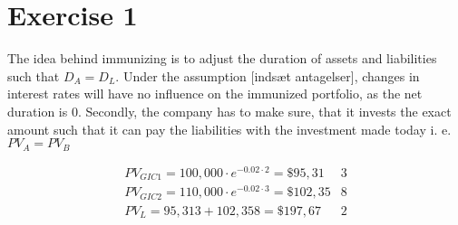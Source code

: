 
\section*{Exercise 1}

The idea behind immunizing is to adjust the duration of assets and liabilities such that $D_{A}=D_{L}$. Under the assumption [indsæt antagelser], changes in interest rates will have no influence on the immunized portfolio, as the net duration is 0. Secondly, the company has to make sure, that it invests the exact amount such that it can pay the liabilities with the investment made today i. e. $PV_A = PV_B$

\begin{align*}
PV_{GIC1} = 100,000\cdot e^{-0.02\cdot 2} = \$ 95,31&3 \\
PV_{GIC2} = 110,000\cdot e^{-0.02\cdot 3} = \$ 102,35&8 \\
PV_{L} = 95,313 + 102,358 = \$ 197,67&2 \\
\end{align*}
